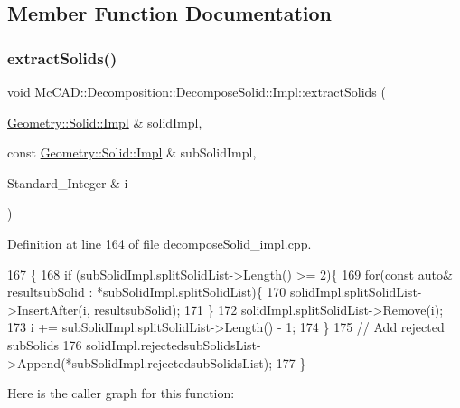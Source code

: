 \subsection{Member Function Documentation}
\mbox{\label{classMcCAD_1_1Decomposition_1_1DecomposeSolid_1_1Impl_a80861ddb3269bb59b3f2333201836e43}} 
\subsubsection{\texorpdfstring{extract\+Solids()}{extractSolids()}\hspace{0.1cm}{\footnotesize\ttfamily [1/2]}}
{\footnotesize\ttfamily void Mc\+C\+A\+D\+::\+Decomposition\+::\+Decompose\+Solid\+::\+Impl\+::extract\+Solids (\begin{DoxyParamCaption}\item[{\hyperlink{classMcCAD_1_1Geometry_1_1Solid_1_1Impl}{Geometry\+::\+Solid\+::\+Impl} \&}]{solid\+Impl,  }\item[{const \hyperlink{classMcCAD_1_1Geometry_1_1Solid_1_1Impl}{Geometry\+::\+Solid\+::\+Impl} \&}]{sub\+Solid\+Impl,  }\item[{Standard\+\_\+\+Integer \&}]{i }\end{DoxyParamCaption})}



Definition at line 164 of file decompose\+Solid\+\_\+impl.\+cpp.


\begin{DoxyCode}
167                             \{
168     \textcolor{keywordflow}{if} (subSolidImpl.splitSolidList->Length() >= 2)\{
169         \textcolor{keywordflow}{for}(\textcolor{keyword}{const} \textcolor{keyword}{auto}& resultsubSolid : *subSolidImpl.splitSolidList)\{
170             solidImpl.splitSolidList->InsertAfter(i, resultsubSolid);
171         \}
172         solidImpl.splitSolidList->Remove(i);
173         i += subSolidImpl.splitSolidList->Length() - 1;
174     \}
175     \textcolor{comment}{// Add rejected subSolids}
176     solidImpl.rejectedsubSolidsList->Append(*subSolidImpl.rejectedsubSolidsList);
177 \}
\end{DoxyCode}
Here is the caller graph for this function\+:
\mbox{\label{classMcCAD_1_1Decomposition_1_1DecomposeSolid_1_1Impl_a80861ddb3269bb59b3f2333201836e43}} 
